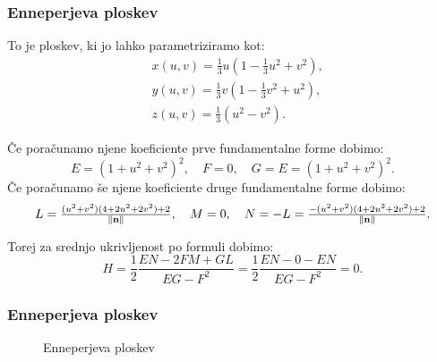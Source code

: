 \documentclass[10pt]{beamer}
\theoremstyle{definition}
\theoremstyle{remark}
\theoremstyle{plain}
\numberwithin{equation}{section}  %
\begin{document}
\begin{frame}
    \frametitle{Enneperjeva ploskev}

    To je ploskev, ki jo lahko parametriziramo kot: 
    $$
    \begin{aligned}
        & x(u,v)=\frac{1}{3} u\left(1-\frac{1}{3} u^2+v^2\right), \\
        & y(u,v)=\frac{1}{3} v\left(1-\frac{1}{3} v^2+u^2\right), \\
        & z(u,v)=\frac{1}{3}\left(u^2-v^2\right).
    \end{aligned}
    $$

    Če poračunamo njene koeficiente prve fundamentalne forme dobimo: 
    $$
    E = (1 + u^2 + v^2)^2, \quad F = 0, \quad G = E = (1 + u^2 + v^2)^2.
    $$
    Če poračunamo še njene koeficiente druge fundamentalne forme dobimo: 
    $$
    \scalebox{1}{$L = \frac{(u^2 + v^2)(4 + 2u^2 + 2v^2) + 2}{\left\|\mathbf{n}\right\|}, \quad M = 0, \quad N = -L = \frac{-(u^2 + v^2)(4 + 2u^2 + 2v^2) + 2}{\left\|\mathbf{n}\right\|}$}.
    $$

    Torej za srednjo ukrivljenost po formuli dobimo: 
    $$
    H=\frac{1}{2} \frac{E N-2 F M+G L}{E G-F^2} = \frac{1}{2} \frac{EN - 0 - EN}{EG - F^2} = 0.
    $$
    
\end{frame}

\begin{frame}
    \frametitle{Enneperjeva ploskev}

   \begin{figure}[H]
        \centering

        \caption{Enneperjeva ploskev}
        \label{fig:4}
    \end{figure}
    
\end{frame}
\end{document}
